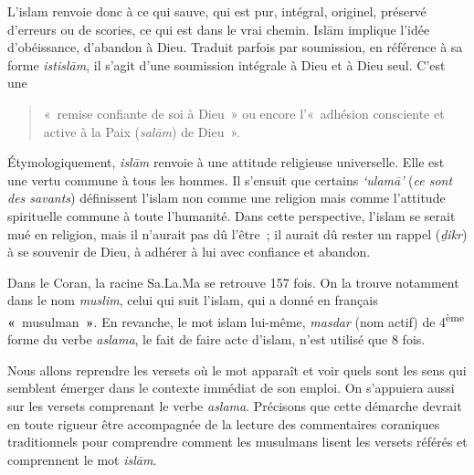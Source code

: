 L'islam renvoie donc à ce qui sauve, qui est pur, intégral, originel,
préservé d'erreurs ou de scories, ce qui est dans le vrai chemin. Islām
implique l'idée d'obéissance, d'abandon à Dieu. Traduit parfois par
soumission, en référence à sa forme \emph{istislām}, il s'agit d'une
soumission intégrale à Dieu et à Dieu seul. C'est une 
\begin{quote}
    «~remise confiante
de soi à Dieu~» ou
encore l'«~adhésion consciente et active à la Paix (\emph{salām}) de
Dieu~». 
\end{quote}Étymologiquement, \emph{islām} renvoie à une attitude religieuse
universelle. Elle est une vertu commune à tous les hommes. Il s'ensuit
que certains \emph{`ulamā'} (\emph{ce sont des savants}) définissent
l'islam non comme une religion mais comme l'attitude spirituelle commune
à toute l'humanité. Dans cette perspective, l'islam se serait mué en
religion, mais il n'aurait pas dû l'être~; il aurait dû rester un rappel
(\emph{ḏikr}) à se souvenir de Dieu, à adhérer à lui avec confiance et
abandon.


Dans le Coran, la racine Sa.La.Ma se retrouve 157 fois. On la trouve
notamment dans le nom \emph{muslim}, celui qui suit l'islam, qui a donné
en français \textbf{«}~musulman~\textbf{»}. En revanche, le mot islam
 lui-même, \emph{masdar} (nom actif) de
4\textsuperscript{ème} forme du verbe \emph{aslama}, le fait de faire
acte d'islam, n'est utilisé que 8 fois.

Nous allons reprendre les versets où le mot apparaît et voir quels sont
les sens qui semblent émerger dans le contexte immédiat de son emploi.
On s'appuiera aussi sur les versets comprenant le verbe \emph{aslama}.
Précisons que cette démarche devrait en toute rigueur être accompagnée
de la lecture des commentaires coraniques traditionnels pour comprendre
comment les musulmans lisent les versets référés et comprennent le mot
\emph{islām}.

